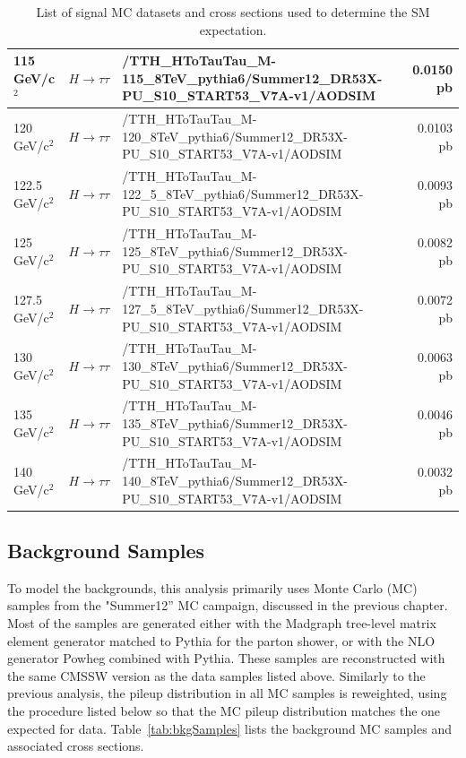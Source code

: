 \begin{table}[hbtp]
\begin{tabular}{|l|p{}|p{}|r|}
\hline
115 GeV/c$^2$ & $H\rightarrow\tau\tau$ & /TTH\_HToTauTau\_M-115\_8TeV\_pythia6/Summer12\_DR53X-PU\_S10\_START53\_V7A-v1/AODSIM & 0.0150 pb \\
\hline
120 GeV/c$^2$ & $H\rightarrow\tau\tau$ & /TTH\_HToTauTau\_M-120\_8TeV\_pythia6/Summer12\_DR53X-PU\_S10\_START53\_V7A-v1/AODSIM & 0.0103 pb \\
\hline
122.5 GeV/c$^2$ & $H\rightarrow\tau\tau$ & /TTH\_HToTauTau\_M-122\_5\_8TeV\_pythia6/Summer12\_DR53X-PU\_S10\_START53\_V7A-v1/AODSIM & 0.0093 pb \\
\hline
125 GeV/c$^2$ & $H\rightarrow\tau\tau$ & /TTH\_HToTauTau\_M-125\_8TeV\_pythia6/Summer12\_DR53X-PU\_S10\_START53\_V7A-v1/AODSIM & 0.0082 pb \\
\hline
127.5 GeV/c$^2$ & $H\rightarrow\tau\tau$ & /TTH\_HToTauTau\_M-127\_5\_8TeV\_pythia6/Summer12\_DR53X-PU\_S10\_START53\_V7A-v1/AODSIM & 0.0072 pb \\
\hline
130 GeV/c$^2$ & $H\rightarrow\tau\tau$ & /TTH\_HToTauTau\_M-130\_8TeV\_pythia6/Summer12\_DR53X-PU\_S10\_START53\_V7A-v1/AODSIM & 0.0063 pb \\
\hline
135 GeV/c$^2$ & $H\rightarrow\tau\tau$ & /TTH\_HToTauTau\_M-135\_8TeV\_pythia6/Summer12\_DR53X-PU\_S10\_START53\_V7A-v1/AODSIM & 0.0046 pb \\
\hline
140 GeV/c$^2$ & $H\rightarrow\tau\tau$ & /TTH\_HToTauTau\_M-140\_8TeV\_pythia6/Summer12\_DR53X-PU\_S10\_START53\_V7A-v1/AODSIM & 0.0032 pb \\

\hline\hline
\end{tabular}
\caption{List of signal MC datasets and cross sections used to determine the SM expectation.}
\label{tab:sigSamples}
\end{table}


\subsection{Background Samples}
\label{background_sample_II_overview}

\par To model the backgrounds, this analysis primarily uses Monte
Carlo (MC) samples from the "Summer12'' MC campaign, discussed in the
previous chapter.  Most of the samples are generated either with the
{\sc Madgraph} tree-level matrix element generator matched to {\sc
  Pythia} for the parton shower, or with the NLO generator {\sc
  Powheg} combined with {\sc Pythia}.  These samples are reconstructed
with the same CMSSW version as the data samples listed above.
Similarly to the previous analysis, the pileup distribution in all MC samples is
reweighted, using the procedure listed below so that the MC pileup
distribution matches the one expected for data.
Table~\ref{tab:bkgSamples} lists the background MC samples and
associated cross sections.  

